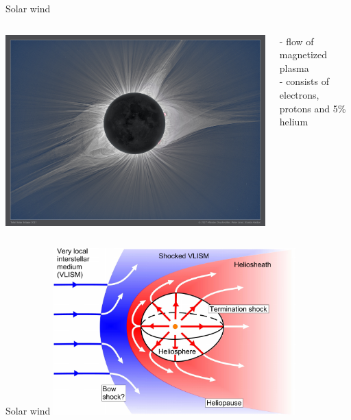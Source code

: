 \begin{frame}[c]{Solar wind}{}
	\begin{columns}[c]

	\includegraphics[width=\textwidth]{../figures_of_others/images/Tse_2017_mi800.jpg}
	
	
	- flow of magnetized plasma\\
	- consists of electrons, protons and 5\% helium
	
	\end{columns}
\end{frame}
\begin{frame}[c]{Solar wind}{}
	\includegraphics[width=0.7\textwidth]{../figures_of_others/images/Owens2013_Heliosphere_screenshot.png}
\end{frame}
